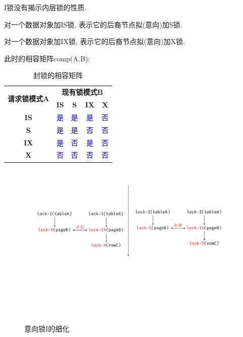 I锁没有揭示内层锁的性质.

\begin{definition}[IS锁]
  对一个数据对象加IS锁, 表示它的后裔节点拟(意向)加S锁.
\end{definition}

\begin{definition}[IX锁]
  对一个数据对象加IX锁, 表示它的后裔节点拟(意向)加X锁.
\end{definition}

此时的相容矩阵comp(A,B):
\begin{table}[H]
    \centering
    \begin{tabular}{|c|c|c|c|c|}
        \hline
        \multirow{2}{*}{\textbf{请求锁模式A}} & \multicolumn{4}{c|}{\textbf{现有锁模式B}} \\ \cline{2-5}
         & \textbf{IS} & \textbf{S} & \textbf{IX} & \textbf{X} \\ \hline
        \textbf{IS} & \textcolor{blue}{是} & \cellcolor{red!10}\textcolor{blue}{是} & \textcolor{blue}{是} & \textcolor{blue}{否} \\ \hline
        \textbf{S} & \textcolor{blue}{是} & \textcolor{blue}{是} & \cellcolor{red!10}\textcolor{blue}{否} & \textcolor{blue}{否} \\ \hline
        \textbf{IX} & \textcolor{blue}{是} & \textcolor{blue}{否} & \cellcolor{red!10}\textcolor{blue}{是} & \textcolor{blue}{否} \\ \hline
        \textbf{X} & \textcolor{blue}{否} & \textcolor{blue}{否} & \textcolor{blue}{否} & \textcolor{blue}{否} \\ \hline
    \end{tabular}
    \caption{封锁的相容矩阵}
\end{table}

\begin{figure}[H]
    \centering
    \includegraphics[width=.8\textwidth]{figure/意向锁-和谐.pdf}
    \caption{意向锁I的细化}
\end{figure}

